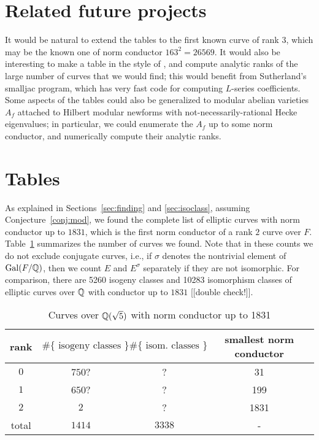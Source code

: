 \documentclass{amsart}
\begin{document}
\section{Related future projects}\label{sec:future}

It would be natural to extend the tables to the first known curve of
rank $3$, which may be the known one of norm conductor $163^2=26569$.
It would also be interesting to make a table in the style of
\cite{stein-watkins:ants5}, and compute analytic ranks of the large
number of curves that we would find; this would benefit from
Sutherland's smalljac program, which has very fast code for computing
$L$-series coefficients.  Some aspects of the tables could also be
generalized to modular abelian varieties $A_f$ attached to Hilbert
modular newforms with not-necessarily-rational Hecke eigenvalues; in
particular, we could enumerate the $A_f$ up to some norm conductor,
and numerically compute their analytic ranks.

\section{Tables}\label{sec:tables}

As explained in Sections~\ref{sec:finding} and \ref{sec:isoclass},
assuming Conjecture~\ref{conj:mod}, we found the complete list of
elliptic curves with norm conductor up to $1831$, which is the first
norm conductor of a rank $2$ curve over $F$.  Table~\ref{table:counts}
summarizes the number of curves we found.  Note that in these counts
we do not exclude conjugate curves, i.e., if $\sigma$ denotes the
nontrivial element of $\operatorname{Gal}(F/\mathbb{Q})$, then we count $E$ and $E^{\sigma}$
separately if they are not isomorphic.  For comparison, 
there are 5260 isogeny classes and 10283 isomorphism classes
of elliptic curves over $\mathbb{Q}$ with conductor up to $1831$ [[double check!]].
\begin{center}
\begin{table}[h]
\caption{Curves over $\mathbb{Q}(\sqrt{5})$ with norm conductor up to 1831\label{table:counts}}
\begin{tabular}{|c|c|c|c|}\hline
rank & $\#\{\text{ isogeny classes }\}$ &  $\#\{\text{ isom. classes }\}$ & smallest norm conductor\\\hline
 $0$ & $750$? & ? & 31\\\hline
 $1$ & $650$? & ? & 199\\\hline
 $2$ & $2$ & ?  & 1831\\\hline
total & $1414$ & $3338$ & - \\\hline
\end{tabular}
\end{table}
\end{center}
\end{document}
